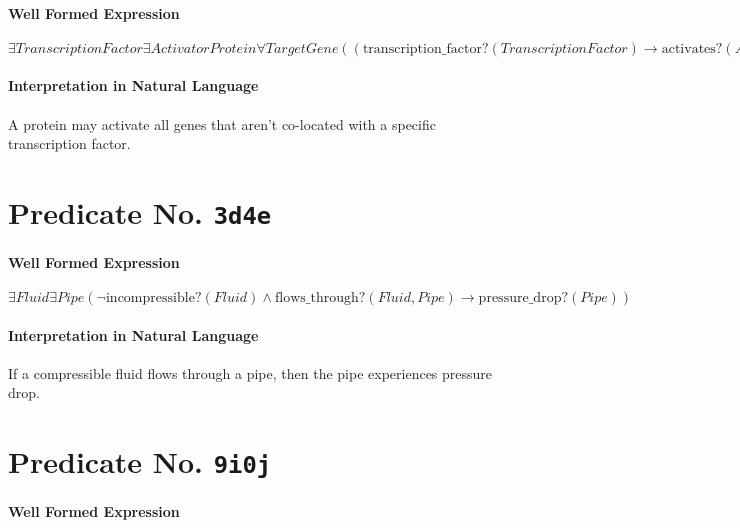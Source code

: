 \documentclass[11pt]{article}
\begin{document}
\paragraph*{Well Formed Expression}
\label{sec:orgc11f343}

\(\exists \mathit{TranscriptionFactor} \exists \mathit{ActivatorProtein} \forall \mathit{TargetGene} ((\mathrm{transcription\_factor?}(\mathit{TranscriptionFactor}) \rightarrow \mathrm{activates?}(\mathit{ActivatorProtein}, \mathit{TargetGene})) \land \neg \mathrm{co\_located?}(\mathit{TranscriptionFactor}, \mathit{TargetGene}))\)

\paragraph*{Interpretation in Natural Language}
\label{sec:org9c9316f}

A protein may activate all genes that aren't co-located with a specific transcription factor.



\section{Predicate No. \texttt{3d4e}}
\label{sec:orgdd0e374}

\paragraph*{Well Formed Expression}
\label{sec:org166f35f}

\(\exists \mathit{Fluid} \exists \mathit{Pipe} (\neg \mathrm{incompressible?}(\mathit{Fluid}) \land \mathrm{flows\_through?}(\mathit{Fluid}, \mathit{Pipe}) \rightarrow \mathrm{pressure\_drop?}(\mathit{Pipe}))\)

\paragraph*{Interpretation in Natural Language}
\label{sec:org0ebe054}

If a compressible fluid flows through a pipe, then the pipe experiences pressure drop.



\section{Predicate No. \texttt{9i0j}}
\label{sec:orga379484}

\paragraph*{Well Formed Expression}
\label{sec:org590202f}
\end{document}
